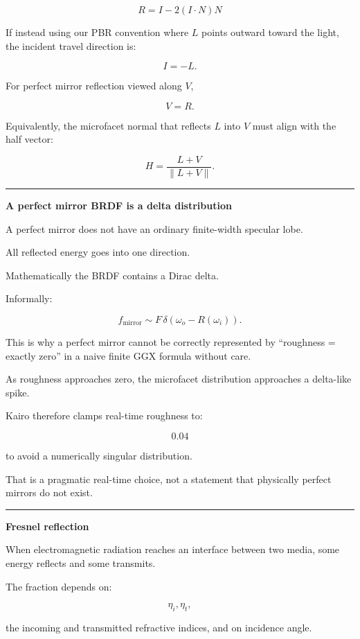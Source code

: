 \[
\boxed{
R=
I-2(I\cdot N)N
}
\]

If instead using our PBR convention where \(L\) points outward toward the light, the incident travel direction is:

\[
I=-L.
\]

For perfect mirror reflection viewed along \(V\),

\[
V=R.
\]

Equivalently, the microfacet normal that reflects \(L\) into \(V\) must align with the half vector:

\[
\boxed{
H=
\frac{L+V}{\|L+V\|}.
}
\]

\begin{center}\rule{0.5\linewidth}{0.5pt}\end{center}

\textbf{A perfect mirror BRDF is a delta distribution}

A perfect mirror does not have an ordinary finite-width specular lobe.

All reflected energy goes into one direction.

Mathematically the BRDF contains a Dirac delta.

Informally:

\[
f_{\text{mirror}}
\sim
F\,\delta(\omega_o-R(\omega_i)).
\]

This is why a perfect mirror cannot be correctly represented by ``roughness = exactly zero'' in a naive finite GGX formula without care.

As roughness approaches zero, the microfacet distribution approaches a delta-like spike.

Kairo therefore clamps real-time roughness to:

\[
0.04
\]

to avoid a numerically singular distribution.

That is a pragmatic real-time choice, not a statement that physically perfect mirrors do not exist.

\begin{center}\rule{0.5\linewidth}{0.5pt}\end{center}

\textbf{Fresnel reflection}

When electromagnetic radiation reaches an interface between two media, some energy reflects and some transmits.

The fraction depends on:

\[
\eta_i,\eta_t,
\]

the incoming and transmitted refractive indices, and on incidence angle.

